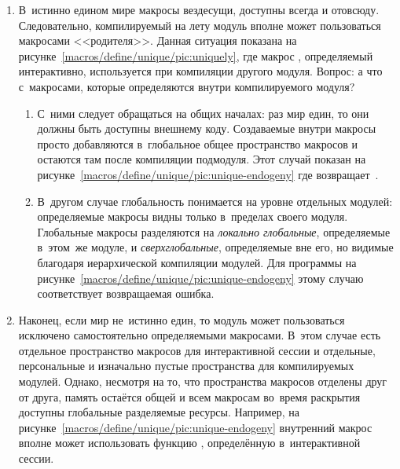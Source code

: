 \begin{enumerate}
  \item В~истинно едином мире макросы вездесущи, доступны всегда и отовсюду.
        Следовательно, компилируемый на лету модуль вполне может
        пользоваться макросами <<родителя>>. Данная ситуация показана на
        рисунке~\ref{macros/define/unique/pic:uniquely}, где макрос
        , определяемый интерактивно, используется при
        компиляции другого модуля. Вопрос: а что с~макросами, которые
        определяются внутри компилируемого модуля?
  \begin{enumerate}
      \item С~ними следует обращаться на общих началах: раз мир един, то
            они должны быть доступны внешнему коду. Создаваемые внутри
            макросы просто добавляются в~глобальное общее пространство
            макросов и остаются там после компиляции подмодуля. Этот случай
            показан на рисунке~\ref{macros/define/unique/pic:unique-endogeny}
            где  возвращает~.

      \item {}
            В~другом случае глобальность понимается на уровне отдельных
            модулей: определяемые макросы видны только в~пределах своего
            модуля. Глобальные макросы разделяются на \emph{локально
            глобальные}, определяемые в~этом~же модуле, и
            \emph{сверхглобальные}, определяемые вне его, но видимые
            благодаря иерархической компиляции модулей. Для программы на
            рисунке~\ref{macros/define/unique/pic:unique-endogeny}
            этому случаю соответствует возвращаемая 
            ошибка.
  \end{enumerate}
  \item Наконец, если мир не~истинно един, то модуль может пользоваться
        исключено самостоятельно определяемыми макросами. В~этом случае есть
        отдельное пространство макросов для интерактивной сессии и отдельные,
        персональные и изначально пустые пространства для компилируемых
        модулей. Однако, несмотря на то, что пространства макросов отделены
        друг от друга, память остаётся общей и всем макросам во~время
        раскрытия доступны глобальные разделяемые ресурсы. Например, на
        рисунке~\ref{macros/define/unique/pic:unique-endogeny} внутренний
        макрос  вполне может использовать функцию ,
        определённую в~интерактивной сессии.
\end{enumerate}

